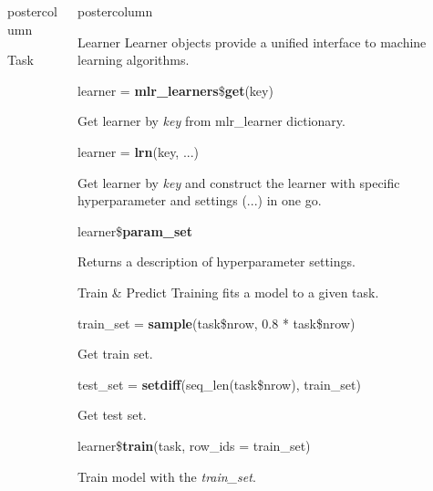 \documentclass{beamer}
\newlength{\columnheight} %
\begin{document}
\begin{frame}[fragile]{}
\begin{columns}
\begin{column}{.245\textwidth}
\begin{beamercolorbox}[center]{postercolumn}
\begin{minipage}{.98\textwidth}
{\begin{myblock}{Task}
					\end{myblock}
					\vfill
				}
			\end{minipage}
		\end{beamercolorbox}
	\end{column}
	\begin{column}{.245\textwidth}
		\begin{beamercolorbox}[center]{postercolumn}
			\begin{minipage}{.98\textwidth}
				\parbox[t][\columnheight]{\textwidth}{
					\begin{myblock}{Learner}
						Learner objects provide a unified interface to machine learning algorithms.
						\\
						\begin{codebox}
							learner = \textbf{mlr\_learners}\$\textbf{get}(key)
						\end{codebox}
						 Get learner by \textit{key} from mlr\_learner dictionary.
						\\
						\begin{codebox}
							learner = \textbf{lrn}(key, ...)
						\end{codebox}
						 Get learner by \textit{key} and construct the learner with specific hyperparameter and settings (...) in one go.
						\\
						\begin{codebox}
							learner\$\textbf{param\_set}
						\end{codebox}
						Returns a description of hyperparameter settings.
					\end{myblock}
				\begin{myblock}{Train \& Predict}
					Training fits a model to a given task. 
					\\
					\begin{codebox}
						train\_set = \textbf{sample}(task\$nrow, 0.8 * task\$nrow)
					\end{codebox}
					Get train set.
					\\
					\begin{codebox}
						test\_set = \textbf{setdiff}(seq\_len(task\$nrow), train\_set)
					\end{codebox}
					Get test set.
					\\
					\begin{codebox}
						learner\$\textbf{train}(task, row\_ids = train\_set)
					\end{codebox}
					Train model with the \textit{train\_set}.
					\\
					\begin{codebox}

\end{codebox}
\end{myblock}}
\end{minipage}
\end{beamercolorbox}
\end{column}
\end{columns}
\end{frame}
\end{document}
